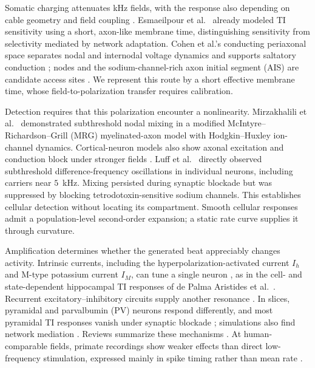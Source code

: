 \documentclass[11pt,a4paper]{article}
\begin{document}
Somatic charging attenuates kHz fields, with the response also depending on cable
geometry and field coupling \cite{deitcher2017,eyal2016}. Esmaeilpour et al.\
\cite{esmaeilpour2021} already modeled TI sensitivity using a short, axon-like
membrane time, distinguishing sensitivity from selectivity mediated by
network adaptation. Cohen et al.'s conducting periaxonal space separates nodal and
internodal voltage dynamics and supports saltatory conduction
\cite{cohen2020periaxonal}; nodes and the sodium-channel-rich axon initial segment
(AIS) are candidate access sites \cite{kole2008ais}. We represent this route by a
short effective membrane time, whose field-to-polarization transfer requires
calibration.

Detection requires that this polarization encounter a nonlinearity. Mirzakhalili
et al.\ \cite{mirzakhalili2020} demonstrated subthreshold nodal mixing in a modified
McIntyre--\allowbreak Richardson--\allowbreak Grill (MRG) myelinated-axon model
with Hodgkin--Huxley ion-channel dynamics. Cortical-neuron models also
show axonal excitation and conduction block under stronger fields \cite{wang2023}.
Luff et al.\ \cite{luff2024mixer} directly observed subthreshold difference-frequency
oscillations in individual neurons, including carriers near $5$~kHz. Mixing persisted
during synaptic blockade but was suppressed by blocking tetrodotoxin-sensitive sodium
channels. This establishes cellular detection without locating its compartment. Smooth
cellular responses admit a population-level second-order expansion; a static
rate curve supplies it through curvature.

Amplification determines whether the generated beat appreciably changes activity.
Intrinsic currents, including the hyperpolarization-activated current $I_h$ and
M-type potassium current $I_M$, can tune a single neuron \cite{hutcheonyarom2000},
as in the cell- and state-dependent hippocampal TI responses of de Palma Aristides
et al.\ \cite{depalma2026ti}. Recurrent excitatory--inhibitory circuits supply another
resonance \cite{brunelhakim1999,brunelwang2003,ledoux2011}. In slices, pyramidal and
parvalbumin (PV) neurons respond differently, and most pyramidal TI responses
vanish under synaptic blockade \cite{caldas2024}; simulations also find network
mediation \cite{karimi2024,esmaeilpour2021}. Reviews summarize these mechanisms
\cite{soroushi2025,wangw2026}. At human-comparable fields, primate recordings show
weaker effects than direct low-frequency stimulation, expressed mainly in spike
timing rather than mean rate \cite{vieira2024}.
\end{document}

